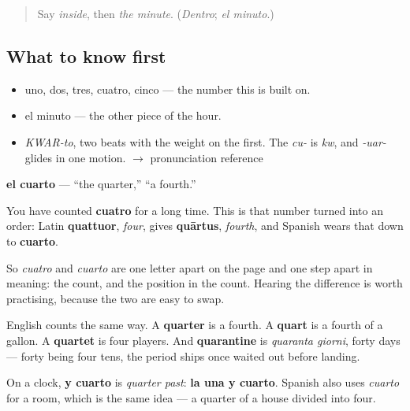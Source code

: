 \label{lesson:ES-C342-cuarto}



\begin{quote}
Say \emph{inside}, then \emph{the minute}. (\emph{Dentro}; \emph{el minuto}.)
\end{quote}

\subsection*{What to know first}
\begin{itemize}
\raggedright
  \item uno, dos, tres, cuatro, cinco — the number this is built on.
  \item el minuto — the other piece of the hour.
\end{itemize}

\begin{sounds}
\begin{itemize}
\raggedright
  \item \emph{KWAR-to}, two beats with the weight on the first. The \emph{cu-} is \emph{kw}, and \emph{-uar-} glides in one motion. $\to$ pronunciation reference
\end{itemize}
\end{sounds}

\begin{cousinweb}
\textbf{el cuarto} — \textquotedblleft{}the quarter,\textquotedblright{} \textquotedblleft{}a fourth.\textquotedblright{}

You have counted \textbf{cuatro} for a long time. This is that number turned into an order: Latin \textbf{quattuor}, \emph{four}, gives \textbf{quārtus}, \emph{fourth}, and Spanish wears that down to \textbf{cuarto}.

So \emph{cuatro} and \emph{cuarto} are one letter apart on the page and one step apart in meaning: the count, and the position in the count. Hearing the difference is worth practising, because the two are easy to swap.

English counts the same way. A \textbf{quarter} is a fourth. A \textbf{quart} is a fourth of a gallon. A \textbf{quartet} is four players. And \textbf{quarantine} is \emph{quaranta giorni}, forty days — forty being four tens, the period ships once waited out before landing.

On a clock, \textbf{y cuarto} is \emph{quarter past}: \textbf{la una y cuarto}. Spanish also uses \emph{cuarto} for a room, which is the same idea — a quarter of a house divided into four.
\end{cousinweb}

